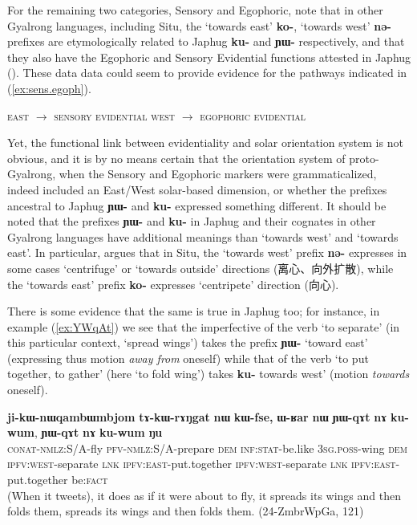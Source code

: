 \documentclass[oldfontcommands,oneside,a4paper,11pt]{article}
\newcommand{\ipa}[1]{\mbox{\phon\textbf{#1}}} %
\newcommand{\zh}[1]{{\cn #1}}
\begin{document}
For the remaining two categories, Sensory and Egophoric, note that in other Gyalrong languages, including Situ, the `towards east' \ipa{ko-}, `towards west' \ipa{nə-} prefixes are etymologically related to Japhug \ipa{ku-} and \ipa{ɲɯ-} respectively, and that they also have the Egophoric and Sensory Evidential functions attested in Japhug (\citealt{lin02dimension}). These data data could seem to provide evidence for the pathways indicated in (\ref{ex:sens.egoph}).


\begin{exe}
\ex \label{ex:sens.egoph}
\glt \textsc{east} $\rightarrow $ \textsc{sensory evidential} 
\glt \textsc{west} $\rightarrow $ \textsc{egophoric evidential}
\end{exe}

Yet, the functional link between evidentiality and solar orientation system is not obvious, and it is by no means certain that the orientation system of proto-Gyalrong, when the Sensory and Egophoric markers were grammaticalized, indeed included an East/West solar-based dimension, or whether the prefixes ancestral to Japhug \ipa{ɲɯ-} and \ipa{ku-} expressed something different.  It should be noted that the prefixes  \ipa{ɲɯ-} and \ipa{ku-} in Japhug and their cognates in other Gyalrong languages have additional meanings than `towards west' and `towards east'. In particular, \citet[228-9]{linxr93jiarong} argues that in Situ, the `towards west' prefix \ipa{nə-} expresses in some cases `centrifuge' or `towards outside' directions (\zh{离心、向外扩散}), while the `towards east' prefix \ipa{ko-} expresses `centripete' direction (\zh{向心}). 

There is some evidence that the same is true in Japhug too; for instance, in example (\ref{ex:YWqAt}) we see that the imperfective of the verb `to separate' (in this particular context, `spread wings') takes the prefix \ipa{ɲɯ-} `toward east' (expressing thus motion \textit{away from} oneself) while that of the verb `to put together, to gather' (here `to fold wing') takes \ipa{ku-}  towards west' (motion \textit{towards} oneself).

\begin{exe}
\ex \label{ex:YWqAt}
\gll \ipa{ji-kɯ-nɯqambɯmbjom} 	\ipa{tɤ-kɯ-rɤŋgat} 	\ipa{nɯ} 	\ipa{kɯ-fse,} 	\ipa{ɯ-ʁar} 	\ipa{nɯ} 	\ipa{ɲɯ-qɤt} 	\ipa{nɤ} 	\ipa{ku-wum}, 	\ipa{ɲɯ-qɤt} 	\ipa{nɤ} 	\ipa{ku-wum} \ipa{ŋu} \\
\textsc{conat-nmlz:S/A}-fly \textsc{pfv-nmlz:S/A}-prepare \textsc{dem} \textsc{inf:stat}-be.like \textsc{3sg.poss}-wing \textsc{dem}  \textsc{ipfv:west}-separate \textsc{lnk} \textsc{ipfv:east}-put.together \textsc{ipfv:west}-separate \textsc{lnk} \textsc{ipfv:east}-put.together be:\textsc{fact} \\
\glt (When it tweets), it does as if it were about to fly, it spreads its wings and then folds them, spreads its wings and then folds them. (24-ZmbrWpGa, 121)
\end{exe}
\end{document}
